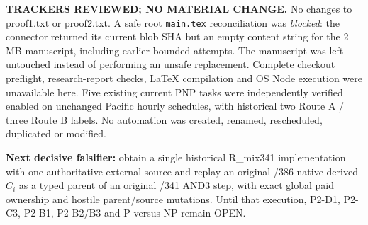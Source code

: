 \documentclass[11pt]{article}
\begin{document}
\noindent\textbf{TRACKERS REVIEWED; NO MATERIAL CHANGE.}
No changes to proof1.txt or proof2.txt. A safe root
\texttt{main.tex} reconciliation was \emph{blocked}: the connector
returned its current blob SHA but an empty content string for
the 2 MB manuscript, including earlier bounded attempts.
The manuscript was left untouched instead of performing an
unsafe replacement. Complete checkout preflight, research-report
checks, LaTeX compilation and OS Node execution were unavailable
here. Five existing current PNP tasks were independently
verified enabled on unchanged Pacific hourly schedules, with
historical two Route A / three Route B labels. No automation
was created, renamed, rescheduled, duplicated or modified.

\noindent\textbf{Next decisive falsifier:} obtain a single
historical R_mix341 implementation with one authoritative
external source and replay an original /386 native derived
$C_i$ as a typed parent of an original /341 AND3 step,
with exact global paid ownership and hostile parent/source
mutations. Until that execution, P2-D1, P2-C3, P2-B1,
P2-B2/B3 and P versus NP remain OPEN.
\end{document}

